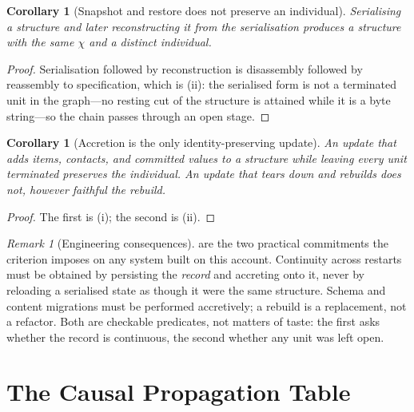 \documentclass[11pt,twocolumn,a4paper]{article}
\theoremstyle{dirthm}
\newtheorem{corollary}[theorem]{Corollary}
\theoremstyle{definition}
\theoremstyle{remark}
\newtheorem{remark}[theorem]{Remark}
\newcommand{\Char}{\chi}
\begin{document}
\begin{corollary}[Snapshot and restore does not preserve an individual]
\label{cor:snapshot}
Serialising a structure and later reconstructing it from the serialisation
produces a structure with the same $\Char$ and a distinct individual.
\end{corollary}

\begin{proof}
Serialisation followed by reconstruction is disassembly followed by
reassembly to specification, which is (ii): the
serialised form is not a terminated unit in the graph---no resting cut of the
structure is attained while it is a byte string---so the chain passes through
an open stage.
\end{proof}

\begin{corollary}[Accretion is the only identity-preserving update]
\label{cor:accretion}
An update that adds items, contacts, and committed values to a structure
while leaving every unit terminated preserves the individual. An update that
tears down and rebuilds does not, however faithful the rebuild.
\end{corollary}

\begin{proof}
The first is (i); the second is
(ii).
\end{proof}

\begin{remark}[Engineering consequences]
\label{rem:engineering-identity}
 are the two practical commitments the
criterion imposes on any system built on this account. Continuity across
restarts must be obtained by persisting the \emph{record} and accreting onto
it, never by reloading a serialised state as though it were the same
structure. Schema and content migrations must be performed accretively; a
rebuild is a replacement, not a refactor. Both are checkable predicates, not
matters of taste: the first asks whether the record is continuous, the second
whether any unit was left open.
\end{remark}

\part{The Causal Propagation Table}
\label{part:table}
\end{document}
